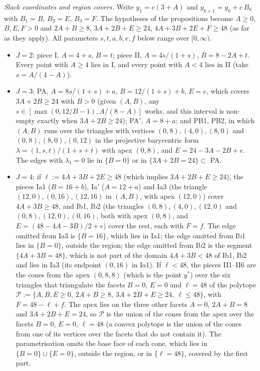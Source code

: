 \emph{Slack coordinates and region covers.} Write $y_1=c(3+A)$ and $y_{k+1}=y_k+c\,B_k$ with $B_1=B$, $B_2=E$,
$B_3=F$. The hypotheses of the propositions become $A\ge0$, $B,E,F>0$ and $2A+B\ge8$, $3A+2B+E\ge24$,
$4A+3B+2E+F\ge48$ (as far as they apply). All parameters $s,t,a,b,e,f$ below range over $[0,\infty)$.
\begin{itemize}
\item $J=2$: piece I, $A=4+s$, $B=t$; piece II, $A=4s/(1+s)$, $B=8-2A+t$. Every point with $A\ge4$ lies in I, and
every point with $A<4$ lies in II (take $s=A/(4-A)$).
\item $J=3$: PA, $A=8s/(1+s)+a$, $B=12/(1+s)+b$, $E=e$, which covers $3A+2B\ge24$ with $B>0$ (given $(A,B)$, any
$s\in[\max(0,12/B-1),A/(8-A)]$ works, and this interval is non-empty exactly when $3A+2B\ge24$); PA$'$, $A=8+a$; and
PB1, PB2, in which $(A,B)$ runs over the triangles with vertices $(0,8),(4,0),(8,0)$ and $(0,8),(8,0),(0,12)$ in the
projective barycentric form $\lambda=(1,s,t)/(1+s+t)$ with apex $(0,8)$, and $E=24-3A-2B+e$. The edges with
$\lambda_1=0$ lie in $\{B=0\}$ or in $\{3A+2B=24\}\subset$ PA.
\item $J=4$: if $\ell:=4A+3B+2E\ge48$ (which implies $3A+2B+E\ge24$), the pieces Ia1 ($B=16+b$), Ia$'$ ($A=12+a$)
and Ia3 (the triangle $(12,0),(0,16),(12,16)$ in $(A,B)$, with apex $(12,0)$) cover $4A+3B\ge48$, and Ib1, Ib2 (the triangles
$(0,8),(4,0),(12,0)$ and $(0,8),(12,0),(0,16)$, both with apex $(0,8)$, and $E=(48-4A-3B)/2+e$) cover the rest, each with
$F=f$. The edge omitted from Ia3 is $\{B=16\}$, which lies in Ia1; the edge omitted from Ib1 lies in $\{B=0\}$, outside the
region; the edge omitted from Ib2 is the segment $\{4A+3B=48\}$, which is not part of the domain $4A+3B<48$ of Ib1, Ib2 and
lies in Ia3 (its endpoint $(0,16)$ in Ia1). If $\ell<48$, the pieces II1--II6 are the cones from the apex $(0,8,8)$ (which is
the point $y^*$) over the six triangles that triangulate the facets $B=0$, $E=0$ and $\ell=48$ of the polytope
$\mathcal P:=\{A,B,E\ge0,\ 2A+B\ge8,\ 3A+2B+E\ge24,\ \ell\le48\}$, with $F=48-\ell+f$. The apex lies on the three other facets
$A=0$, $2A+B=8$ and $3A+2B+E=24$, so $\mathcal P$ is the union of the cones from the apex over the facets $B=0$, $E=0$,
$\ell=48$ (a convex polytope is the union of the cones from one of its vertices over the facets that do not contain it).
The parametrisation omits the base face of each cone, which lies in $\{B=0\}\cup\{E=0\}$, outside the region, or in
$\{\ell=48\}$, covered by the first part.
\end{itemize}
